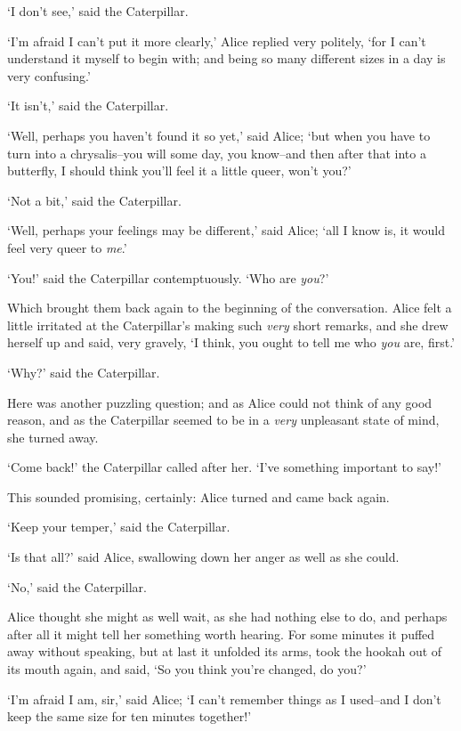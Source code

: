   `I don't see,' said the Caterpillar.

  `I'm afraid I can't put it more clearly,' Alice replied very
politely, `for I can't understand it myself to begin with; and
being so many different sizes in a day is very confusing.'

  `It isn't,' said the Caterpillar.

  `Well, perhaps you haven't found it so yet,' said Alice; `but
when you have to turn into a chrysalis--you will some day, you
know--and then after that into a butterfly, I should think you'll
feel it a little queer, won't you?'

  `Not a bit,' said the Caterpillar.

  `Well, perhaps your feelings may be different,' said Alice;
`all I know is, it would feel very queer to {\it me}.'

  `You!' said the Caterpillar contemptuously.  `Who are {\it you}?'

  Which brought them back again to the beginning of the
conversation.  Alice felt a little irritated at the Caterpillar's
making such {\it very} short remarks, and she drew herself up and said,
very gravely, `I think, you ought to tell me who {\it you} are, first.'

  `Why?' said the Caterpillar.

  Here was another puzzling question; and as Alice could not
think of any good reason, and as the Caterpillar seemed to be in
a {\it very} unpleasant state of mind, she turned away.

  `Come back!' the Caterpillar called after her.  `I've something
important to say!'

  This sounded promising, certainly:  Alice turned and came back
again.

  `Keep your temper,' said the Caterpillar.

  `Is that all?' said Alice, swallowing down her anger as well as
she could.

  `No,' said the Caterpillar.

  Alice thought she might as well wait, as she had nothing else
to do, and perhaps after all it might tell her something worth
hearing.  For some minutes it puffed away without speaking, but
at last it unfolded its arms, took the hookah out of its mouth
again, and said, `So you think you're changed, do you?'

  `I'm afraid I am, sir,' said Alice; `I can't remember things as
I used--and I don't keep the same size for ten minutes together!'

